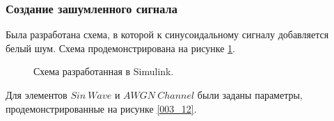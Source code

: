 \documentclass[a4paper,14pt]{extarticle}
\begin{document}
\subsubsection{Создание зашумленного сигнала}

Была разработана схема, в которой к синусоидальному сигналу добавляется белый шум. Схема продемонстрирована на рисунке \ref{003}.

\begin{figure}[H]
\caption{Схема разработанная в Simulink.}
\label{003}
\end{figure}

Для элементов $Sin \ Wave$ и $AWGN \ Channel$ были заданы параметры, продемонстрированные на рисунке \ref{003_12}.
\end{document}
